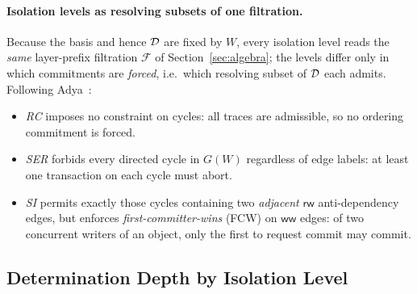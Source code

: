 \paragraph{Isolation levels as resolving subsets of one filtration.}
Because the basis and hence $\mathcal{D}$ are fixed by $W$, every isolation level
reads the \emph{same} layer-prefix filtration $\mathcal F$ of
Section~\ref{sec:algebra}; the levels differ only in which commitments are
\emph{forced}, i.e.\ which resolving subset of $\mathcal{D}$ each admits. Following
Adya~\cite{adya1999weak}:
\begin{itemize}[nosep]
  \item \emph{RC} imposes no constraint on cycles: all traces are admissible,
        so no ordering commitment is forced.
  \item \emph{SER} forbids every directed cycle in $G(W)$ regardless of edge
        labels: at least one transaction on each cycle must abort.
  \item \emph{SI} permits exactly those cycles containing two
        \emph{adjacent} $\mathsf{rw}$ anti-dependency edges, but enforces
        \emph{first-committer-wins} (FCW) on $\mathsf{ww}$ edges: of two
        concurrent writers of an object, only the first to request commit may
        commit.
\end{itemize}

\subsection{Determination Depth by Isolation Level}
\label{sec:txn-depth-section}

